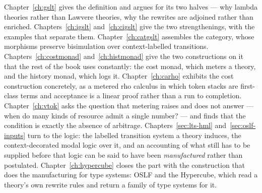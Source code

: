 Chapter~\ref{ch:gslt} gives the definition and argues for its two
halves --- why lambda theories rather than Lawvere theories, why the
rewrites are adjoined rather than enriched.
Chapters~\ref{ch:igslt} and~\ref{ch:cigslt} give the two strengthenings,
with the examples that separate them.
Chapter~\ref{ch:catgslt} assembles the category, whose morphisms preserve
bisimulation over context-labelled transitions.
Chapters~\ref{ch:costmonad} and~\ref{ch:histmonad} give the two
constructions on it that the rest of the book uses constantly: the cost
monad, which meters a theory, and the history monad, which logs it.
Chapter~\ref{ch:carho} exhibits the cost construction concretely, as a
metered rho calculus in which token stacks are first-class terms and
acceptance is a linear proof rather than a run to completion.
Chapter~\ref{ch:vtok} asks the question that metering raises and does not
answer --- when do many kinds of resource admit a single number? --- and
finds that the condition is exactly the absence of arbitrage.
Chapters~\ref{sec:lts-hml} and~\ref{sec:oslf-inputs} turn to the logic:
the labelled transition system a theory induces, the context-decorated
modal logic over it, and an accounting of what still has to be supplied
before that logic can be said to have been \emph{manufactured} rather
than postulated.
Chapter~\ref{ch:hypercube} closes the part with the construction that
does the manufacturing for type systems: OSLF and the Hypercube, which
read a theory's own rewrite rules and return a family of type systems for
it.

